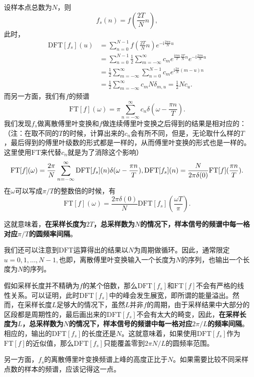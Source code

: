 设样本点总数为$N$，则
\[
f_s (n) = f \left( \frac{2T}{N}n \right),
\]
此时，
\[
\begin{aligned}
    \mathrm{DFT}[f_s](u) &= \sum_{n=0}^{N-1} f\left( \frac{2T}{N}n \right) e^{-\mathrm{i} \frac{2\pi n}{N}u} \\
    &= \sum_{n=0}^{N-1} \frac{1}{2} \sum_{m = -\infty}^{\infty} c_m e^{\frac{\mathrm{i}\pi m}{T} \frac{2T}{N}n } e^{-\mathrm{i} \frac{2\pi n}{N}u} \\
    &= \frac{1}{2} \sum_{m=-\infty}^\infty \sum_{n=0}^{N-1} c_m e^{\mathrm{i}\frac{2\pi}{N} (m-u)n} \\
    &= \frac{1}{2} \sum_{m=-\infty}^\infty c_m N \delta_{m,u} = \frac{1}{2} N c_u.
\end{aligned}
\]
而另一方面，我们有$f$的频谱
\[
\mathrm{FT}[f](\omega) = \pi \sum_{n=-\infty}^\infty c_n \delta(\omega - \frac{\pi n}{T}).
\]
我们发现$f_s$做离散傅里叶变换和$f$做连续傅里叶变换之后得到的结果是相对应的：（注：在取不同的$T$的时候，计算出来的$c_n$会有所不同，但是，无论取什么样的$T$，最后得到的傅里叶级数的形式都是一样的，从而傅里叶变换的形式也是一样的。这里使用$\mathrm{FT}$来代替$c_n$就是为了消除这个影响）
\[
\mathrm{FT}[f](\omega) = \frac{2\pi}{N} \sum_{n=-\infty}^\infty \mathrm{DFT}[f_s](n) \delta(\omega - \frac{\pi n}{T}), \\
\mathrm{DFT}[f_s](n) = \frac{N}{2\pi \delta(0)} \mathrm{FT}[f](\frac{\pi n}{T}).
\]
在$\omega$可以写成$\pi/T$的整数倍的时候，有
\[
\mathrm{FT}[f](\omega) = \frac{2\pi \delta(0)}{N} \mathrm{DFT}[f_s](\frac{\omega T}{\pi}).
\]

这就意味着，\textbf{在采样长度为$2T$，总采样数为$N$的情况下，样本信号的频谱中每一格对应$\pi/T$的圆频率间隔}。

我们还可以注意到$\mathrm{DFT}$运算得出的结果以$N$为周期做循环。因此，通常限定$u=0, 1, \ldots, N-1,$也即，离散傅里叶变换输入一个长度为$N$的序列，也输出一个长度为$N$的序列。

假如采样长度并不精确为$f$的某个倍数，那么$\mathrm{DFT}[f_s]$和$\mathrm{FT}[f]$不会有严格的线性关系。可以证明，此时$\mathrm{DFT}[f_s]$中的峰会发生展宽，即所谓的能量溢出。然而，在采样长度$L$足够大的情况下，虽然$L$并非$f$的周期，由于采样结果中大部分的区段都是周期性的，最后画出来的$\mathrm{DFT}[f_s]$不会有太大的畸变，因此，\textbf{在采样长度为$L$，总采样数为$N$的情况下，样本信号的频谱中每一格对应$2\pi/L$的频率间隔}。相应的，输出的$\mathrm{DFT}[f_s]$的长度还是$N$。这就意味着，如果使用$\mathrm{DFT}[f_s]$作为$\mathrm{FT}[f]$的近似值，那么$\mathrm{DFT}[f_s]$只能覆盖零到$2\pi N/L$的圆频率范围。

另一方面，$f_s$的离散傅里叶变换频谱上峰的高度正比于$N$。如果需要比较不同采样点数的样本的频谱，应该记得这一点。
